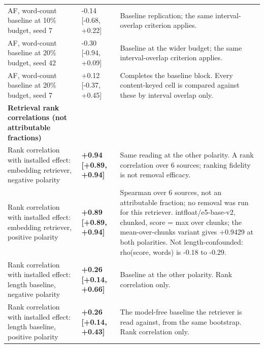 \documentclass[10pt]{article}
\begin{document}
{\begin{longtable}{ p{4.47cm}lp{8.33cm} }
AF, word-count baseline at 10\% budget, seed 7 & -0.14 [-0.68, +0.22] & Baseline replication; the same interval-overlap criterion applies. \\

AF, word-count baseline at 20\% budget, seed 42 & -0.30 [-0.94, +0.09] & Baseline at the wider budget; the same interval-overlap criterion applies. \\

AF, word-count baseline at 20\% budget, seed 7 & +0.12 [-0.37, +0.45] & Completes the baseline block. Every content-keyed cell is compared against these by interval overlap only. \\

\textbf{ Retrieval rank correlations (not attributable fractions) } &  &  \\

Rank correlation with installed effect: embedding retriever, negative polarity & \textbf{ +0.94 [+0.89, +0.94] } & Same reading at the other polarity. A rank correlation over 6 sources; ranking fidelity is not removal efficacy. \\

Rank correlation with installed effect: embedding retriever, positive polarity & \textbf{ +0.89 [+0.89, +0.94] } & Spearman over 6 sources, not an attributable fraction; no removal was run for this retriever. intfloat/e5-base-v2, chunked, score = max over chunks; the mean-over-chunks variant gives +0.9429 at both polarities. Not length-confounded: rho(score, words) is -0.18 to -0.29. \\

Rank correlation with installed effect: length baseline, negative polarity & \textbf{ +0.26 [+0.14, +0.66] } & Baseline at the other polarity. Rank correlation only. \\

Rank correlation with installed effect: length baseline, positive polarity & \textbf{ +0.26 [+0.14, +0.43] } & The model-free baseline the retriever is read against, from the same bootstrap. Rank correlation only. \\

\end{longtable}
}
\end{document}
